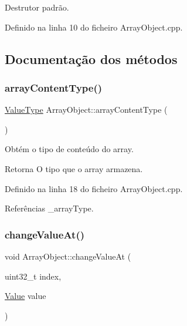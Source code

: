 Destrutor padrão. 



Definido na linha 10 do ficheiro Array\+Object.\+cpp.



\subsection{Documentação dos métodos}
\mbox{\label{classArrayObject_a389af37c0ab94e2c84985ab1698ce679}} 
\subsubsection{\texorpdfstring{array\+Content\+Type()}{arrayContentType()}}
{\footnotesize\ttfamily \hyperlink{BasicTypes_8h_ad9971b6ef33e02ba2c75d19c1d2518a1}{Value\+Type} Array\+Object\+::array\+Content\+Type (\begin{DoxyParamCaption}{ }\end{DoxyParamCaption})}



Obtém o tipo de conteúdo do array. 

\begin{DoxyReturn}{Retorna}
O tipo que o array armazena. 
\end{DoxyReturn}


Definido na linha 18 do ficheiro Array\+Object.\+cpp.



Referências \+\_\+array\+Type.

\mbox{\label{classArrayObject_a20e1735b3bc9db6c9bd219d70355f160}} 
\subsubsection{\texorpdfstring{change\+Value\+At()}{changeValueAt()}}
{\footnotesize\ttfamily void Array\+Object\+::change\+Value\+At (\begin{DoxyParamCaption}\item[{uint32\+\_\+t}]{index,  }\item[{\hyperlink{structValue}{Value}}]{value }\end{DoxyParamCaption})}



